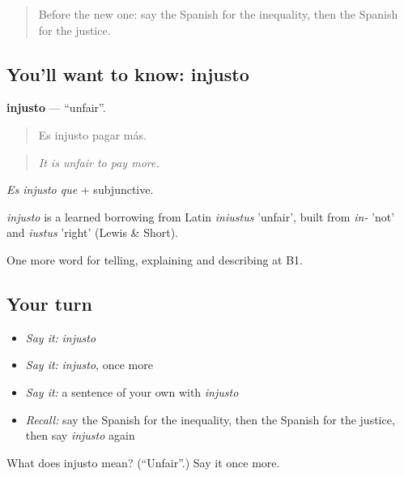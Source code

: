 \label{lesson:ES-C603-injusto}



\begin{quote}
Before the new one: say the Spanish for the inequality, then the Spanish for the justice.
\end{quote}

\subsection*{You'll want to know: injusto}
\textbf{injusto} — \textquotedblleft{}unfair\textquotedblright{}.

\begin{quote}
Es injusto pagar más.
\end{quote}

\begin{quote}
\emph{It is unfair to pay more.}
\end{quote}

\emph{Es injusto que} + subjunctive.

\begin{cousinweb}
\emph{injusto} is a learned borrowing from Latin \emph{iniustus} 'unfair', built from \emph{in-} 'not' and \emph{iustus} 'right' (Lewis \& Short).
\end{cousinweb}

\begin{grammarlens}[title={What you've built}]
One more word for telling, explaining and describing at B1.
\end{grammarlens}

\subsection*{Your turn}
\begin{itemize}
\raggedright
  \item \emph{Say it:} \emph{injusto}
  \item \emph{Say it:} \emph{injusto}, once more
  \item \emph{Say it:} a sentence of your own with \emph{injusto}
  \item \emph{Recall:} say the Spanish for the inequality, then the Spanish for the justice, then say \emph{injusto} again
\end{itemize}

\begin{tcolorbox}[breakable,colback=teal!4,colframe=teal!35!black,title={Before you move on}]
What does injusto mean? (\textquotedblleft{}Unfair\textquotedblright{}.) Say it once more.
\end{tcolorbox}

